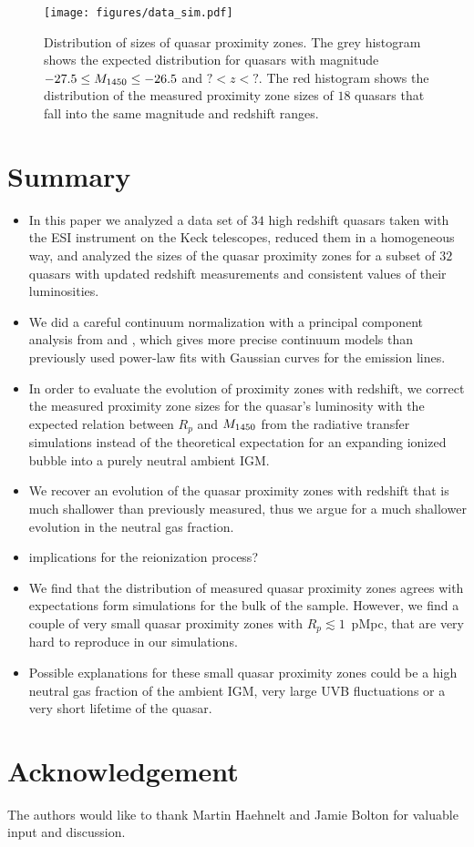 \documentclass[iop]{emulateapj}
\newcommand{\hii} {\ion{H}{2}\xspace}
\begin{document}
\begin{figure}
\centering
\texttt{[image: figures/data\_sim.pdf]}
\caption{Distribution of sizes of quasar proximity zones. The grey histogram shows the expected distribution for quasars with magnitude $-27.5\leq M_{\rm 1450}\leq -26.5$ and $?<z<?$. The red histogram shows the distribution of the measured proximity zone sizes of $18$ quasars that fall into the same magnitude and redshift ranges. \label{fig:comp_sim}} 
\end{figure}



\section{Summary}\label{sec:summary}
\begin{itemize}
\item In this paper we analyzed a data set of $34$ high redshift quasars taken with the ESI instrument on the Keck telescopes, reduced them in a homogeneous way, and analyzed the sizes of the quasar proximity zones for a subset of $32$ quasars with updated redshift measurements and consistent values of their luminosities. 
\item We did a careful continuum normalization with a principal component analysis from \citet{Paris2011} and \citet{Suzuki2006}, which gives more precise continuum models than previously used power-law fits with Gaussian curves for the emission lines. 
\item In order to evaluate the evolution of proximity zones with redshift, we correct the measured proximity zone sizes for the quasar's luminosity with the expected relation between $R_p$ and $M_{\rm 1450}$ from the radiative transfer simulations instead of the theoretical expectation for an expanding ionized \hii bubble into a purely neutral ambient IGM. 
\item We recover an evolution of the quasar proximity zones with redshift that is much shallower than previously measured, thus we argue for a much shallower evolution in the neutral gas fraction. 
\item implications for the reionization process?
\item We find that the distribution of measured quasar proximity zones agrees with expectations form simulations for the bulk of the sample. However, we find a couple of very small quasar proximity zones with $R_p\lesssim 1$~pMpc, that are very hard to reproduce in our simulations. 
\item Possible explanations for these small quasar proximity zones could be a high neutral gas fraction of the ambient IGM, very large UVB fluctuations or a very short lifetime of the quasar. 
\end{itemize}



\section*{Acknowledgement}
The authors would like to thank Martin Haehnelt and Jamie Bolton for valuable input and discussion. 


\end{document}
